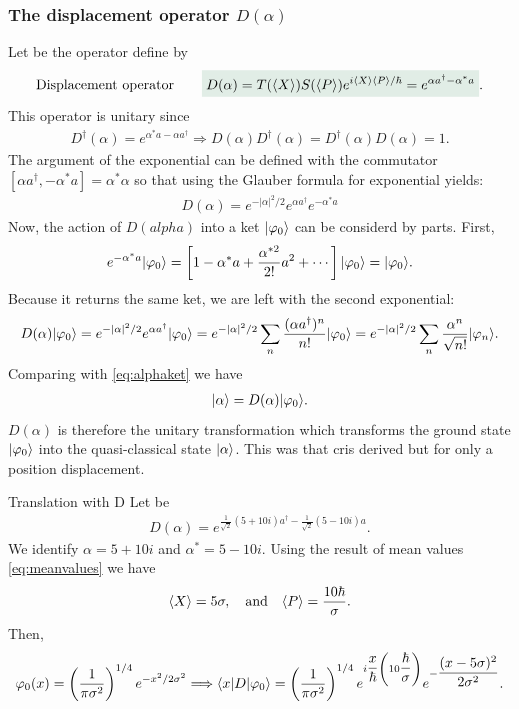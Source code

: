 \subsubsection{The displacement operator $D(\alpha)$}
Let be the operator define by 
\begin{align}
    \text{Displacement operator}\qquad\highlight{D(\alpha)=T(\braket{X})S(\braket{P})e^{i\braket{X}\braket{P}/\hbar}=e^{\alpha a^\dagger-\alpha^*a}}.
\end{align}
This operator is unitary since 
\begin{align*}
    D^\dagger(\alpha)=e^{\alpha^*a-\alpha a^\dagger}\Longrightarrow D(\alpha)D^\dagger(\alpha)=D^\dagger(\alpha)D(\alpha)=1.
\end{align*}
The argument of the exponential can be defined with the commutator $[\alpha a^\dagger,-\alpha^* a]=\alpha^*\alpha$ so that using the Glauber formula for exponential 
yields:
\begin{align*}
    D(\alpha)=e^{-|\alpha|^2/2}e^{\alpha a^\dagger}e^{-\alpha^*a}
\end{align*}
Now, the action of $D(alpha)$ into a ket $|\varphi_0\rangle$ can be considerd by parts. First,
\begin{align*}
    e^{-\alpha^*a}|\varphi_0\rangle=\left[1-\alpha^*a+\frac{\alpha^{*2}}{2!}a^2+\cdots\right]|\varphi_0\rangle=|\varphi_0\rangle.
\end{align*}
Because it returns the same ket, we are left with the second exponential:
\begin{align*}
    D(\alpha)|\varphi_0\rangle=e^{-|\alpha|^2/2}e^{\alpha a^\dagger}|\varphi_0\rangle=e^{-|\alpha|^2/2}\sum_n\frac{(\alpha a^\dagger)^n}{n!}|\varphi_0\rangle=e^{-|\alpha|^2/2}\sum_n\frac{\alpha^n}{\sqrt{n!}}|\varphi_n\rangle.
\end{align*}
Comparing with \eqref{eq:alphaket} we have 
\begin{align}
    |\alpha\rangle=D(\alpha)|\varphi_0\rangle.
\end{align}
$D(\alpha)$ is therefore the unitary transformation which transforms the ground state $|\varphi_0\rangle$ into the quasi-classical state $|\alpha\rangle$.
This was that cris derived but for only a position displacement.
\begin{example}{Translation with D}
    Let be 
    \begin{align*}
        D(\alpha)=e^{\frac{1}{\sqrt{2}}(5+10i)a^\dagger-\frac{1}{\sqrt{2}}(5-10i)a}.
    \end{align*}
    We identify $\alpha=5+10i$ and $\alpha^*=5-10i$. Using the result of mean values \eqref{eq:meanvalues} we have 
    \begin{align*}
        \langle X\rangle=5\sigma,\quad\text{and}\quad\langle P\rangle=\frac{10\hbar}{\sigma}.
    \end{align*}
    Then,
    \begin{align*}
        \varphi_0(x)=\left(\frac{1}{\pi\sigma^2}\right)^{1/4}e^{-x^2/2\sigma^2}\Longrightarrow\langle x|D|\varphi_0\rangle=\left(\frac{1}{\pi\sigma^2}\right)^{1/4}e^{i\dfrac{x}{\hbar}\left(10\dfrac{\hbar}{\sigma}\right)}e^{-\dfrac{(x-5\sigma)^2}{2\sigma^2}}.
    \end{align*}
\end{example}
%
